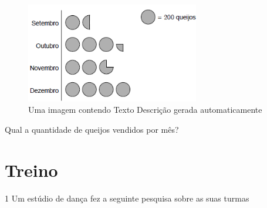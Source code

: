 \begin{escolha}
\begin{boxmedio}
\begin{boxmedio}
{\begin{boxpeq}
\begin{boxpeq}
{\begin{boxpeq}
\begin{boxmedio}
\begin{boxmedio}
\begin{boxpeq}
\begin{boxmedio}
\begin{boxpeq}
\begin{boxpeq}
\begin{boxpeq}
\begin{boxpeq}
\begin{boxmedio}
{\begin{boxmedio}
\begin{boxmedio}
\begin{boxpeq}
\begin{boxmedio}
\begin{boxpeq}
\begin{boxpeq}
\begin{boxpeq}
\begin{escolha}
{\begin{boxmedio}
\begin{boxpeq}
\begin{boxpeq}
\begin{boxpeq}
\begin{boxpeq}
\begin{boxpeq}
\begin{boxmedio}
\begin{boxpeq}
\begin{boxpeq}
\begin{boxpeq}
{\begin{boxpeq}
\begin{boxmedio}
\begin{boxpeq}
\begin{boxpeq}
\begin{boxpeq}
{\begin{boxpeq}
\begin{boxmedio}
{\begin{boxpeq}
\begin{boxpeq}
\begin{boxmedio}
\begin{boxmedio}
\begin{boxpeq}
\begin{boxpeq}
{\begin{boxpeq}
\begin{boxpeq}
\begin{boxpeq}
\begin{boxpeq}
\begin{boxpeq}
\begin{escolha}
\begin{escolha}
{\begin{boxmedio}
\begin{boxpeq}
\begin{q°}
\begin{boxmedio}
\begin{boxpeq}
\begin{boxpeq}
\begin{boxmedio}
\begin{boxmedio}
\begin{boxmedio}
\begin{boxmedio}
\begin{figure}
\centering
\includegraphics[width=2.97917in,height=1.71639in]{./_SAEB_9_MAT/media/image223.png}
\caption{Uma imagem contendo Texto Descrição gerada automaticamente}
\end{figure}


Qual a quantidade de queijos vendidos por mês?


\section{Treino}

\num{1}
  Um estúdio de dança fez a seguinte pesquisa sobre as suas turmas 


\end{boxmedio}
\end{boxmedio}
\end{boxmedio}
\end{boxmedio}
\end{boxpeq}
\end{boxpeq}
\end{boxmedio}
\end{q°}
\end{boxpeq}
\end{boxmedio}}
\end{escolha}
\end{escolha}
\end{boxpeq}
\end{boxpeq}
\end{boxpeq}
\end{boxpeq}
\end{boxpeq}}
\end{boxpeq}
\end{boxpeq}
\end{boxmedio}
\end{boxmedio}
\end{boxpeq}
\end{boxpeq}}
\end{boxmedio}
\end{boxpeq}}
\end{boxpeq}
\end{boxpeq}
\end{boxpeq}
\end{boxmedio}
\end{boxpeq}}
\end{boxpeq}
\end{boxpeq}
\end{boxpeq}
\end{boxmedio}
\end{boxpeq}
\end{boxpeq}
\end{boxpeq}
\end{boxpeq}
\end{boxpeq}
\end{boxmedio}}
\end{escolha}
\end{boxpeq}
\end{boxpeq}
\end{boxpeq}
\end{boxmedio}
\end{boxpeq}
\end{boxmedio}
\end{boxmedio}}
\end{boxmedio}
\end{boxpeq}
\end{boxpeq}
\end{boxpeq}
\end{boxpeq}
\end{boxmedio}
\end{boxpeq}
\end{boxmedio}
\end{boxmedio}
\end{boxpeq}}
\end{boxpeq}
\end{boxpeq}}
\end{boxmedio}
\end{boxmedio}
\end{escolha}
